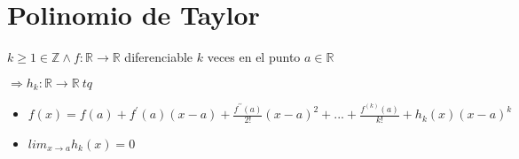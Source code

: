 \documentclass[../practica_05.tex]{subfiles}
\begin{document}
    \section*{Polinomio de Taylor}

        $k \geq 1 \in \mathbb{Z} \wedge f: \mathbb{R} \to \mathbb{R} $ diferenciable $ k $ veces en el punto $a \in \mathbb{R}$

        $\Rightarrow h_k: \mathbb{R} \to \mathbb{R}\ tq$

        \begin{itemize}
            \item $f(x) = f(a) + f^\prime(a)(x-a) + \frac{f^{\prime\prime}(a)}{2!} (x-a)^2 + ... + \frac{f^{(k)}(a)}{k!} + h_k(x)(x-a)^k $
            \item $lim_{x \to a} h_k(x) = 0$
        \end{itemize}
\end{document}
